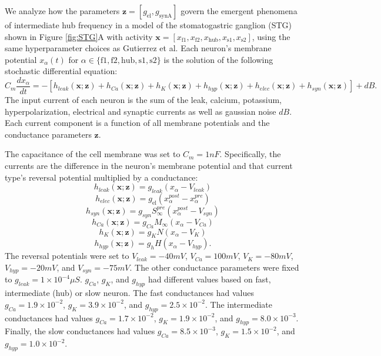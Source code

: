 \documentclass[11pt]{article}
\begin{document}
We analyze how the parameters $\mathbf{z} = [ g_{\text{el}}, g_{\text{synA}}]$ govern the emergent phenomena of intermediate hub frequency in a model of the stomatogastric ganglion (STG) \cite{gutierrez2013multiple} shown in Figure \ref{fig:STG}A with activity $\mathbf{x} = \left[ x_{\text{f1}}, x_{\text{f2}}, x_{\text{hub}}, x_{\text{s1}}, x_{\text{s2}} \right]$, using the same hyperparameter choices as Gutierrez et al.
Each neuron's membrane potential $x_\alpha(t)$ for $\alpha \in \{ \text{f1}, \text{f2}, \text{hub}, \text{s1}, \text{s2} \}$ is the solution of the following stochastic differential equation:
\begin{equation} C_m \frac{dx_\alpha}{dt} = - \left[ h_{leak}(\mathbf{x}; \mathbf{z}) + h_{Ca}(\mathbf{x}; \mathbf{z}) + h_K(\mathbf{x}; \mathbf{z}) + h_{hyp}(\mathbf{x}; \mathbf{z}) + h_{elec}(\mathbf{x}; \mathbf{z}) + h_{syn}(\mathbf{x}; \mathbf{z})\right] + dB.
\end{equation} 
The input current of each neuron is the sum of the leak, calcium, potassium, hyperpolarization, electrical and synaptic currents as well as gaussian noise $dB$.
Each current component is a function of all membrane potentials and the conductance parameters $\mathbf{z}$.

The capacitance of the cell membrane was set to $C_m = 1nF$. Specifically, the currents are the difference in the neuron's membrane potential and that current type's reversal potential multiplied by a conductance:
\begin{equation}  h_{leak}(\mathbf{x}; \mathbf{z}) = g_{leak} (x_\alpha - V_{leak}) 
\end{equation} 
\begin{equation}  h_{elec}(\mathbf{x}; \mathbf{z}) = g_{\text{el}} (x_\alpha^{post} - x_\alpha^{pre})
\end{equation} 
\begin{equation}  h_{syn}(\mathbf{x}; \mathbf{z}) = g_{syn} S_\infty^{pre} (x_\alpha^{post} - V_{syn}) \end{equation} 
\begin{equation}  h_{Ca}(\mathbf{x}; \mathbf{z}) = g_{Ca} M_\infty (x_\alpha - V_{Ca}) 
\end{equation} 
\begin{equation}  h_K(\mathbf{x}; \mathbf{z}) = g_K N (x_\alpha - V_K) 
\end{equation} 
\begin{equation}  h_{hyp}(\mathbf{x}; \mathbf{z}) = g_h H(x_\alpha - V_{hyp}).
\end{equation} 
The reversal potentials were set to $V_{leak} = -40mV$, $V_{Ca} = 100mV$, $V_K = -80mV$, $V_{hyp} = -20mV$, and $V_{syn} = -75mV$.  
The other conductance parameters were fixed to $g_{leak} = 1 \times 10^{-4} \mu S$. $g_{Ca}$, $g_{K}$, and $g_{hyp}$ had different values based on fast, intermediate (hub) or slow neuron.  
The fast conductances had values $g_{Ca} = 1.9 \times 10^{-2}$, $ g_K = 3.9 \times 10^{-2} $, and $ g_{hyp} = 2.5 \times 10^{-2} $.  
The intermediate conductances had values $g_{Ca} = 1.7 \times 10^{-2}$, $ g_K = 1.9 \times 10^{-2} $, and $ g_{hyp} = 8.0 \times 10^{-3} $.  
Finally, the slow conductances had values $g_{Ca} = 8.5 \times 10^{-3}$, $ g_K = 1.5 \times 10^{-2} $, and $ g_{hyp} = 1.0 \times 10^{-2} $.
\end{document}
